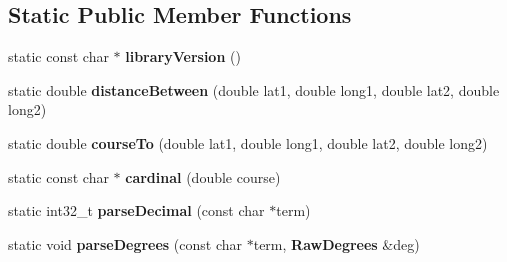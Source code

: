 \subsection*{Static Public Member Functions}
\begin{DoxyCompactItemize}
\item 
static const char $\ast$ {\bfseries library\+Version} ()\label{class_tiny_g_p_s_plus_a1ec39648e1c80c59f4fded642fdb88ae}

\item 
static double {\bfseries distance\+Between} (double lat1, double long1, double lat2, double long2)\label{class_tiny_g_p_s_plus_add9aef227cf2836b53cbdfed5133bb4d}

\item 
static double {\bfseries course\+To} (double lat1, double long1, double lat2, double long2)\label{class_tiny_g_p_s_plus_a82b8fff820573de45c9ae98df3abbdfa}

\item 
static const char $\ast$ {\bfseries cardinal} (double course)\label{class_tiny_g_p_s_plus_a68029db9475edf20c750eb0b7a6f1118}

\item 
static int32\+\_\+t {\bfseries parse\+Decimal} (const char $\ast$term)\label{class_tiny_g_p_s_plus_afd333e29a6a337affc6531183d716e04}

\item 
static void {\bfseries parse\+Degrees} (const char $\ast$term, {\bf Raw\+Degrees} \&deg)\label{class_tiny_g_p_s_plus_ad17b86db786450c5c7249aba98090954}

\end{DoxyCompactItemize}
